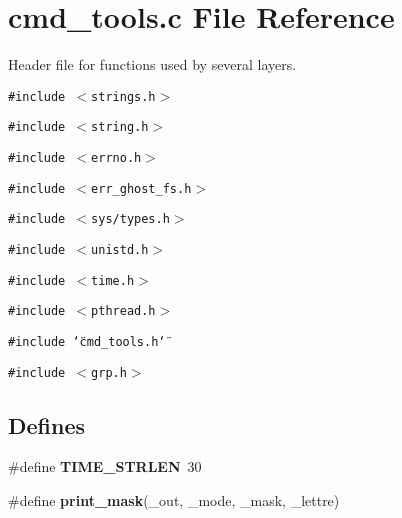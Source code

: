 \section{cmd\_\-tools.c File Reference}
\label{cmd__tools_8c}
Header file for functions used by several layers. 

{\tt \#include $<$strings.h$>$}\par
{\tt \#include $<$string.h$>$}\par
{\tt \#include $<$errno.h$>$}\par
{\tt \#include $<$err\_\-ghost\_\-fs.h$>$}\par
{\tt \#include $<$sys/types.h$>$}\par
{\tt \#include $<$unistd.h$>$}\par
{\tt \#include $<$time.h$>$}\par
{\tt \#include $<$pthread.h$>$}\par
{\tt \#include \char`\"{}cmd\_\-tools.h\char`\"{}}\par
{\tt \#include $<$grp.h$>$}\par
\subsection*{Defines}
\begin{CompactItemize}
\item 
\#define {\bf TIME\_\-STRLEN}\ 30
\item 
\#define {\bf print\_\-mask}(\_\-out, \_\-mode, \_\-mask, \_\-lettre)
\end{CompactItemize}
